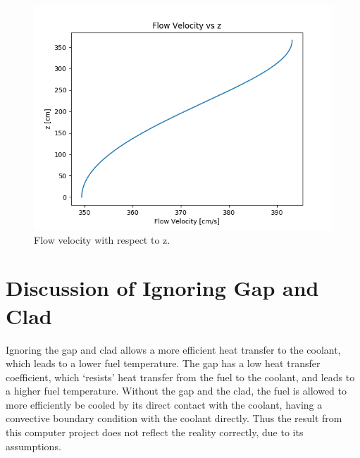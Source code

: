 \documentclass[12pt,letterpaper]{article}
\begin{document}
\begin{figure}[htbp!]
    \begin{center}
        \includegraphics[scale=0.7]{u_c_z.png}
    \end{center}
    \caption{Flow velocity with respect to z.}
    \label{fig:u_c_z}
\end{figure}

\section*{Discussion of Ignoring Gap and Clad}
Ignoring the gap and clad allows a more efficient heat transfer
to the coolant, which leads to a lower fuel temperature. 
The gap has a low heat transfer coefficient, which `resists' heat
transfer from the fuel to the coolant, and leads to a higher
fuel temperature. Without the gap and the clad, the fuel is 
allowed to more efficiently be cooled by its direct contact
with the coolant, having a convective boundary condition with
the coolant directly. Thus the result from this computer project
does not reflect the reality correctly, due to its assumptions.



\pagebreak


\pagebreak
\end{document}
